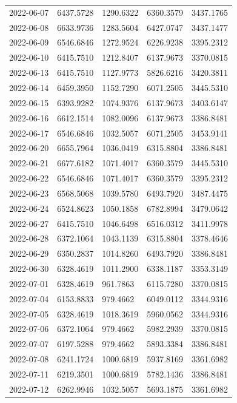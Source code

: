\begin{footnotesize}
\begin{longtable}{lllll}
2022-06-07 & 6437.5728 & 1290.6322 & 6360.3579 & 3437.1765 \\
2022-06-08 & 6633.9736 & 1283.5604 & 6427.0747 & 3437.1477 \\
2022-06-09 & 6546.6846 & 1272.9524 & 6226.9238 & 3395.2312 \\
2022-06-10 & 6415.7510 & 1212.8407 & 6137.9673 & 3370.0815 \\
2022-06-13 & 6415.7510 & 1127.9773 & 5826.6216 & 3420.3811 \\
2022-06-14 & 6459.3950 & 1152.7290 & 6071.2505 & 3445.5310 \\
2022-06-15 & 6393.9282 & 1074.9376 & 6137.9673 & 3403.6147 \\
2022-06-16 & 6612.1514 & 1082.0096 & 6137.9673 & 3386.8481 \\
2022-06-17 & 6546.6846 & 1032.5057 & 6071.2505 & 3453.9141 \\
2022-06-20 & 6655.7964 & 1036.0419 & 6315.8804 & 3386.8481 \\
2022-06-21 & 6677.6182 & 1071.4017 & 6360.3579 & 3445.5310 \\
2022-06-22 & 6546.6846 & 1071.4017 & 6360.3579 & 3395.2312 \\
2022-06-23 & 6568.5068 & 1039.5780 & 6493.7920 & 3487.4475 \\
2022-06-24 & 6524.8623 & 1050.1858 & 6782.8994 & 3479.0642 \\
2022-06-27 & 6415.7510 & 1046.6498 & 6516.0312 & 3411.9978 \\
2022-06-28 & 6372.1064 & 1043.1139 & 6315.8804 & 3378.4646 \\
2022-06-29 & 6350.2837 & 1014.8260 & 6493.7920 & 3386.8481 \\
2022-06-30 & 6328.4619 & 1011.2900 & 6338.1187 & 3353.3149 \\
2022-07-01 & 6328.4619 & 961.7863 & 6115.7280 & 3370.0815 \\
2022-07-04 & 6153.8833 & 979.4662 & 6049.0112 & 3344.9316 \\
2022-07-05 & 6328.4619 & 1018.3619 & 5960.0562 & 3344.9316 \\
2022-07-06 & 6372.1064 & 979.4662 & 5982.2939 & 3370.0815 \\
2022-07-07 & 6197.5288 & 979.4662 & 5893.3384 & 3386.8481 \\
2022-07-08 & 6241.1724 & 1000.6819 & 5937.8169 & 3361.6982 \\
2022-07-11 & 6219.3501 & 1000.6819 & 5782.1436 & 3386.8481 \\
2022-07-12 & 6262.9946 & 1032.5057 & 5693.1875 & 3361.6982 \\

\end{longtable}
\end{footnotesize}
